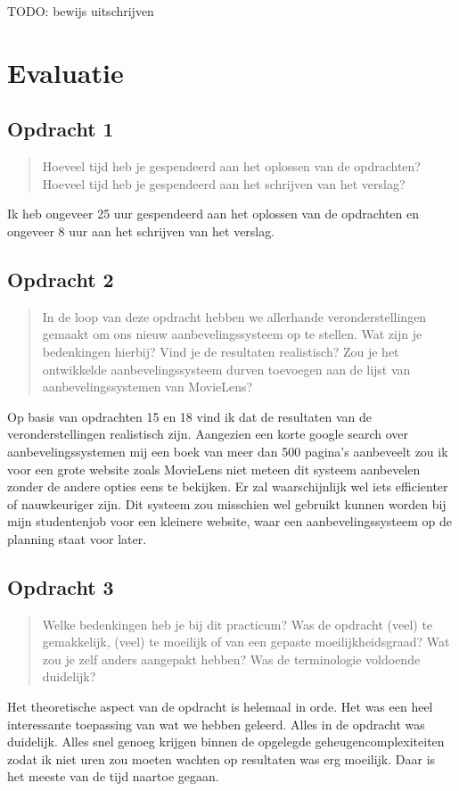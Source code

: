 \documentclass[11pt, a4paper, titlepage, openright]{article}
\begin{document}
    TODO: bewijs uitschrijven


\section{Evaluatie}

	\subsection{Opdracht 1}
		\begin{quote}
			Hoeveel tijd heb je gespendeerd aan het oplossen van de opdrachten?
			Hoeveel tijd heb je gespendeerd aan het schrijven van het verslag?
		\end{quote}
        Ik heb ongeveer 25 uur gespendeerd aan het oplossen van de opdrachten en ongeveer 8 uur aan het schrijven van het verslag.

	\subsection{Opdracht 2}
		\begin{quote}
			In de loop van deze opdracht hebben we allerhande veronderstellingen gemaakt om ons nieuw aanbevelingssysteem
            op te stellen. Wat zijn je bedenkingen hierbij? Vind je de resultaten realistisch? Zou je het ontwikkelde
            aanbevelingssysteem durven toevoegen aan de lijst van aanbevelingssystemen van MovieLens?
		\end{quote}
        Op basis van opdrachten 15 en 18 vind ik dat de resultaten van de veronderstellingen realistisch zijn. Aangezien een korte google
        search over aanbevelingssystemen mij een boek van meer dan 500 pagina's aanbeveelt zou ik voor een grote website zoals MovieLens
        niet meteen dit systeem aanbevelen zonder de andere opties eens te bekijken. Er zal waarschijnlijk wel iets efficienter
        of nauwkeuriger zijn. Dit systeem zou misschien wel gebruikt kunnen worden bij mijn studentenjob voor een kleinere website,
        waar een aanbevelingssysteem op de planning staat voor later.

	\subsection{Opdracht 3}
		\begin{quote}
			Welke bedenkingen heb je bij dit practicum? Was de opdracht (veel) te gemakkelijk, (veel) te moeilijk of
			van een gepaste moeilijkheidsgraad? Wat zou je zelf anders aangepakt hebben? Was de terminologie voldoende duidelijk?
		\end{quote}
        Het theoretische aspect van de opdracht is helemaal in orde. Het was een heel interessante toepassing van wat we hebben geleerd.
        Alles in de opdracht was duidelijk. Alles snel genoeg krijgen binnen de opgelegde geheugencomplexiteiten zodat ik niet uren
        zou moeten wachten op resultaten was erg moeilijk. Daar is het meeste van de tijd naartoe gegaan.
\end{document}
